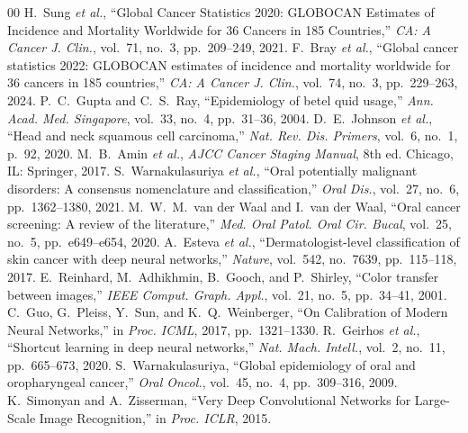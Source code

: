 \documentclass[journal]{IEEEtran}
\begin{document}
\begin{thebibliography}{00}
 H.~Sung \textit{et al.}, ``Global Cancer Statistics 2020: GLOBOCAN Estimates of Incidence and Mortality Worldwide for 36 Cancers in 185 Countries,'' \textit{CA: A Cancer J. Clin.}, vol.~71, no.~3, pp.~209--249, 2021.
 F.~Bray \textit{et al.}, ``Global cancer statistics 2022: GLOBOCAN estimates of incidence and mortality worldwide for 36 cancers in 185 countries,'' \textit{CA: A Cancer J. Clin.}, vol.~74, no.~3, pp.~229--263, 2024.
 P.~C.~Gupta and C.~S.~Ray, ``Epidemiology of betel quid usage,'' \textit{Ann. Acad. Med. Singapore}, vol.~33, no.~4, pp.~31--36, 2004.
 D.~E.~Johnson \textit{et al.}, ``Head and neck squamous cell carcinoma,'' \textit{Nat. Rev. Dis. Primers}, vol.~6, no.~1, p.~92, 2020.
 M.~B.~Amin \textit{et al.}, \textit{AJCC Cancer Staging Manual}, 8th ed. Chicago, IL: Springer, 2017.
 S.~Warnakulasuriya \textit{et al.}, ``Oral potentially malignant disorders: A consensus nomenclature and classification,'' \textit{Oral Dis.}, vol.~27, no.~6, pp.~1362--1380, 2021.
 M.~W.~M.~van der Waal and I.~van der Waal, ``Oral cancer screening: A review of the literature,'' \textit{Med. Oral Patol. Oral Cir. Bucal}, vol.~25, no.~5, pp.~e649--e654, 2020.
 A.~Esteva \textit{et al.}, ``Dermatologist-level classification of skin cancer with deep neural networks,'' \textit{Nature}, vol.~542, no.~7639, pp.~115--118, 2017.
 E.~Reinhard, M.~Adhikhmin, B.~Gooch, and P.~Shirley, ``Color transfer between images,'' \textit{IEEE Comput. Graph. Appl.}, vol.~21, no.~5, pp.~34--41, 2001.
 C.~Guo, G.~Pleiss, Y.~Sun, and K.~Q.~Weinberger, ``On Calibration of Modern Neural Networks,'' in \textit{Proc. ICML}, 2017, pp.~1321--1330.
 R.~Geirhos \textit{et al.}, ``Shortcut learning in deep neural networks,'' \textit{Nat. Mach. Intell.}, vol.~2, no.~11, pp.~665--673, 2020.
 S.~Warnakulasuriya, ``Global epidemiology of oral and oropharyngeal cancer,'' \textit{Oral Oncol.}, vol.~45, no.~4, pp.~309--316, 2009.
 K.~Simonyan and A.~Zisserman, ``Very Deep Convolutional Networks for Large-Scale Image Recognition,'' in \textit{Proc. ICLR}, 2015.

\end{thebibliography}
\end{document}
